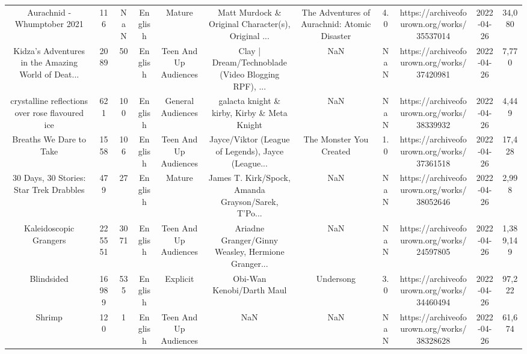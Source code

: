 \begin{table}[h!]
{\begin{tabular}{|c|c|c|c|c|c|c|c|c|c|c|}
                       Aurachnid - Whumptober 2021 &    116 &   NaN &  English &                Mature & Matt Murdock \& Original Character(s), Original ... &       The Adventures of Aurachnid: Atomic Disaster &   4.0 & https://archiveofourown.org/works/35537014 & 2022-04-26 &    34,080 \\
Kidza's Adventures in the Amazing World of Deat... &   2089 &    50 &  English & Teen And Up Audiences & Clay | Dream/Technoblade (Video Blogging RPF), ... &                                                NaN &   NaN & https://archiveofourown.org/works/37420981 & 2022-04-26 &     7,770 \\
   crystalline reflections over rose flavoured ice &    621 &   100 &  English &     General Audiences &        galacta knight \& kirby, Kirby \& Meta Knight &                                                NaN &   NaN & https://archiveofourown.org/works/38339932 & 2022-04-26 &     4,449 \\
                           Breaths We Dare to Take &   1558 &   106 &  English & Teen And Up Audiences & Jayce/Viktor (League of Legends), Jayce (League... &                            The Monster You Created &   1.0 & https://archiveofourown.org/works/37361518 & 2022-04-26 &    17,428 \\
           30 Days, 30 Stories: Star Trek Drabbles &    479 &    27 &  English &                Mature & James T. Kirk/Spock, Amanda Grayson/Sarek, T'Po... &                                                NaN &   NaN & https://archiveofourown.org/works/38052646 & 2022-04-26 &     2,998 \\
                            Kaleidoscopic Grangers & 225551 &  3071 &  English & Teen And Up Audiences & Ariadne Granger/Ginny Weasley, Hermione Granger... &                                                NaN &   NaN & https://archiveofourown.org/works/24597805 & 2022-04-26 & 1,389,149 \\
                                        Blindsided &  16989 &   535 &  English &              Explicit &                          Obi-Wan Kenobi/Darth Maul &                                          Undersong &   3.0 & https://archiveofourown.org/works/34460494 & 2022-04-26 &    97,222 \\
                                            Shrimp &    120 &     1 &  English & Teen And Up Audiences &                                                NaN &                                                NaN &   NaN & https://archiveofourown.org/works/38328628 & 2022-04-26 &    61,674 \\

\end{tabular}}
\end{table}
